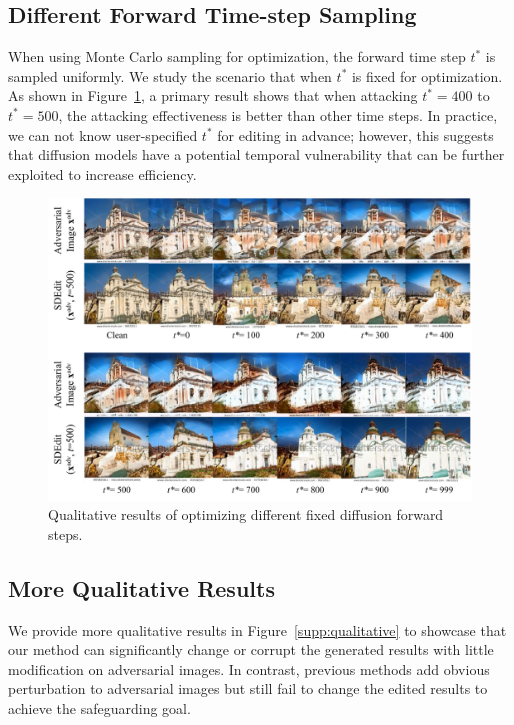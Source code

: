 \subsection{Different Forward Time-step Sampling}

When using Monte Carlo sampling for optimization, the forward time step $t^*$ is sampled uniformly. We study the scenario that when $t^*$ is fixed for optimization. As shown in Figure~\ref{fig:different_timestep}, a primary result shows that when attacking $t^*=400$ to $t^*=500$, the attacking effectiveness is better than other time steps. In practice, we can not know user-specified $t^*$ for editing in advance; however, this suggests that diffusion models have a potential temporal vulnerability that can be further exploited to increase efficiency.

\begin{figure}[h]
\centering
\includegraphics[width=0.9\linewidth]{figures/different_timestep.pdf}
\caption{Qualitative results of optimizing different fixed diffusion forward steps.}
\label{fig:different_timestep}
\end{figure}

\subsection{More Qualitative Results}
We provide more qualitative results in Figure~\ref{supp:qualitative} to showcase that our method can significantly change or corrupt the generated results with little modification on adversarial images. In contrast, previous methods add obvious perturbation to adversarial images but still fail to change the edited results to achieve the safeguarding goal.

